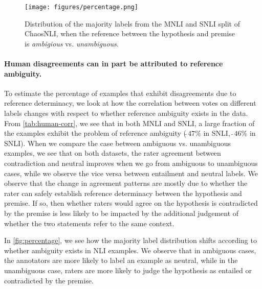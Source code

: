 




\begin{figure}[h]
    \centering
    \texttt{[image: figures/percentage.png]}
    \caption{Distribution of the majority labels from the MNLI and SNLI split of ChaosNLI, when the reference between the hypothesis and premise is \textit{ambigious} vs. \textit{unambiguous}.}
    \label{fig:percentage}
\end{figure}

\paragraph{Human disagreements can in part be attributed to reference ambiguity.} 
To estimate the percentage of examples that exhibit disagreements due to reference determinacy, we look at how the correlation between votes on different labels changes with respect to whether reference ambiguity exists in the data. From \autoref{tab:human-corr}, we see that in both MNLI and SNLI, a large fraction of the examples exhibit the problem of reference ambiguity ($\tilde~47\%$ in SNLI, $\tilde~46\%$ in SNLI). When we compare the case between ambiguous vs. unambiguous examples, we see that on both datasets, the rater agreement between contradiction and neutral improves when we go from ambiguous to unambiguous cases, while we observe the vice versa between entailment and neutral labels. 
We observe that the change in agreement patterns are mostly due to whether the rater can safely establish reference determinacy between the hypothesis and premise. If so, then whether raters would agree on the hypothesis is contradicted by the premise is less likely to be impacted by the additional judgement of whether the two statements refer to the same context. 

In \autoref{fig:percentage}, we see how the majority label distribution shifts according to whether ambiguity exists in NLI examples. We observe that in ambiguous cases, the annotators are more likely to label an example as neutral, while in the unambiguous case, raters are more likely to judge the hypothesis as entailed or contradicted by the premise. 

